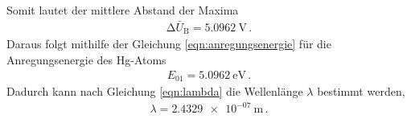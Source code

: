 \noindent
Somit lautet der mittlere Abstand der Maxima
\begin{align*}
    \increment \bar{U}_\text{B} =  \SI{5.0962}{\volt} \, .
\end{align*}
\noindent
Daraus folgt mithilfe der Gleichung \eqref{eqn:anregungsenergie} für die Anregungsenergie des Hg-Atoms
\begin{align*}
    E_{01}=\SI{5.0962}{\electronvolt} \, .
\end{align*}
\noindent
Dadurch kann nach Gleichung \eqref{eqn:lambda} die Wellenlänge $\lambda$ bestimmt werden,
\begin{align*}
    \lambda = \SI{2.4329e-07}{\metre} \, .
\end{align*}